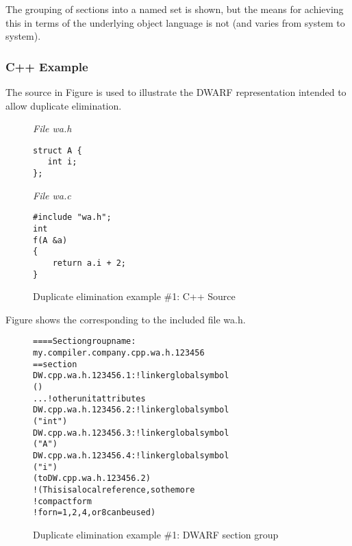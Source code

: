 The grouping of sections into a named set is shown, but the means for achieving this in terms of
the underlying object language is not (and varies from system to system).

\subsubsection{C++ Example}

The  source 
in 
Figure 
is used to illustrate the DWARF
representation intended to allow duplicate elimination.

\begin{figure}[ht]
\textit{File wa.h}
\begin{lstlisting}[numbers=none]
struct A {
   int i;
};
\end{lstlisting}
\textit{File wa.c}
\begin{lstlisting}[numbers=none]
#include "wa.h";
int
f(A &a)
{
    return a.i + 2;
}
\end{lstlisting}
\caption{Duplicate elimination example \#1: C++ Source}
\label{fig:duplicateeliminationexample1csource}
\end{figure}

Figure 
shows the  corresponding to the included file 
wa.h.

\begin{figure}
\begin{dwflisting}
\begin{alltt}
==== Section group name:
    my.compiler.company.cpp.wa.h.123456
== section \dotdebuginfo{}
DW.cpp.wa.h.123456.1:     ! linker global symbol
    \DWTAGcompileunit
        \DWATlanguage(\DWLANGCplusplus)
        ...  ! other unit attributes
DW.cpp.wa.h.123456.2:     ! linker global symbol
    \DWTAGbasetype
        \DWATname("int")
DW.cpp.wa.h.123456.3:     ! linker global symbol
    \DWTAGstructuretype
        \DWATname("A")
DW.cpp.wa.h.123456.4:     ! linker global symbol
        \DWTAGmember
        \DWATname("i")
        \DWATtype(\DWFORMrefn to DW.cpp.wa.h.123456.2)
            ! (This is a local reference, so the more
            ! compact form \DWFORMrefn 
            ! for n = 1,2,4, or 8 can be used)
\end{alltt}
\end{dwflisting}
\vspace{2mm}
\caption{Duplicate elimination example \#1: DWARF section group} 
\label{fig:duplicateeliminationexample1dwarfsectiongroup}
\end{figure}

